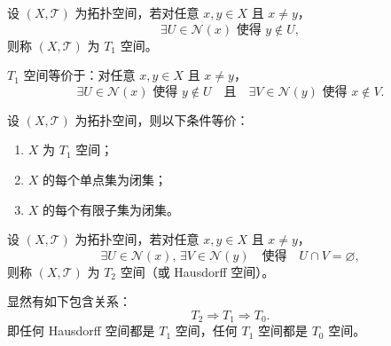 \documentclass[lang=cn,a4paper,newtx,figureplace=section,tableplace=section]{elegantbook}
\begin{document}
\begin{definition}[$T_1$ 空间]\label{def:T1}
设 $(X,\mathcal{T})$ 为拓扑空间，若对任意 $x, y \in X$ 且 $x \neq y$，
\begin{equation}
\exists U \in \mathcal{N}(x) \text{ 使得 } y \notin U,
\end{equation}
则称 $(X,\mathcal{T})$ 为 $T_1$ 空间。
\end{definition}

\begin{remark}
$T_1$ 空间等价于：对任意 $x, y \in X$ 且 $x \neq y$，
\begin{equation}
\exists U \in \mathcal{N}(x) \text{ 使得 } y \notin U \quad \text{且} \quad \exists V \in \mathcal{N}(y) \text{ 使得 } x \notin V.
\end{equation}
\end{remark}

\begin{proposition}\label{prop:T1-characterization}
设 $(X,\mathcal{T})$ 为拓扑空间，则以下条件等价：
\begin{enumerate}
    \item $X$ 为 $T_1$ 空间；
    \item $X$ 的每个单点集为闭集；
    \item $X$ 的每个有限子集为闭集。
\end{enumerate}
\end{proposition}

\begin{definition}[$T_2$ 空间 (Hausdorff)]\label{def:T2}
设 $(X,\mathcal{T})$ 为拓扑空间，若对任意 $x, y \in X$ 且 $x \neq y$，
\begin{equation}
\exists U \in \mathcal{N}(x), \, \exists V \in \mathcal{N}(y) \quad \text{使得} \quad U \cap V = \varnothing,
\end{equation}
则称 $(X,\mathcal{T})$ 为 $T_2$ 空间（或 Hausdorff 空间）。
\end{definition}

\begin{remark}
显然有如下包含关系：
\begin{equation}
T_2 \Rightarrow T_1 \Rightarrow T_0.
\end{equation}
即任何 Hausdorff 空间都是 $T_1$ 空间，任何 $T_1$ 空间都是 $T_0$ 空间。
\end{remark}
\end{document}

